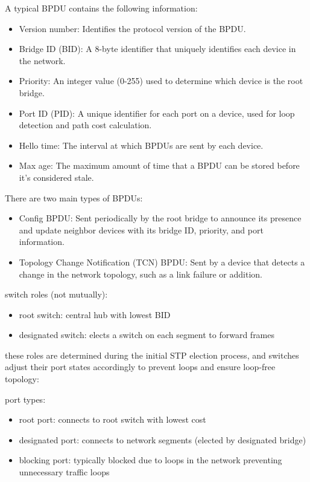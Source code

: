 \documentclass[parindent=0pt]{article}
\begin{document}
A typical BPDU contains the following information:
	\begin{itemize}
		\item Version number: Identifies the protocol version of the BPDU.
		\item Bridge ID (BID): A 8-byte identifier that uniquely identifies each device in the network.
		\item Priority: An integer value (0-255) used to determine which device is the root bridge.
		\item Port ID (PID): A unique identifier for each port on a device, used for loop detection and path cost calculation.
		\item Hello time: The interval at which BPDUs are sent by each device.
		\item Max age: The maximum amount of time that a BPDU can be stored before it's considered stale.
	\end{itemize}

There are two main types of BPDUs:
	\begin{itemize}
		\item Config BPDU: Sent periodically by the root bridge to announce its presence and update neighbor devices with its bridge ID, priority, and port information.
		\item Topology Change Notification (TCN) BPDU: Sent by a device that detects a change in the network topology, such as a link failure or addition.
	\end{itemize}


switch roles (not mutually):
	\begin{itemize}
		\item root switch: central hub with lowest BID
		\item designated switch: elects a switch on each segment to forward frames
	\end{itemize}
these roles are determined during the initial STP election process, and switches adjust their port states accordingly to prevent loops and ensure loop-free topology:

port types:
	\begin{itemize}
		\item root port: connects to root switch with lowest cost
		\item designated port: connects to network segments (elected by designated bridge)
		\item blocking port: typically blocked due to loops in the network preventing unnecessary traffic loops
	\end{itemize}
\end{document}
